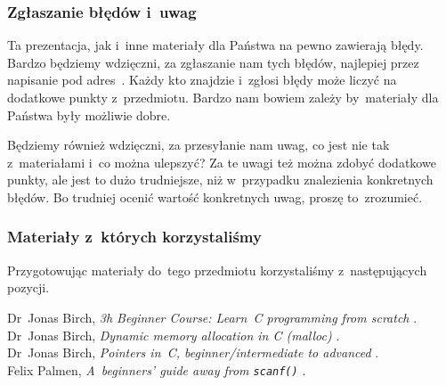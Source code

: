 \documentclass[10pt,t]{beamer}
\begin{document}
\begin{frame}
  \frametitle{Zgłaszanie błędów i~uwag}


  Ta prezentacja, jak i~inne materiały dla Państwa na pewno zawierają
  błędy. Bardzo będziemy wdzięczni, za zgłaszanie nam tych błędów,
  najlepiej przez napisanie pod adres~\email. Każdy kto znajdzie i~zgłosi
  błędy może liczyć na dodatkowe punkty z~przedmiotu. Bardzo nam bowiem
  zależy by~materiały dla Państwa były możliwie dobre.

  Będziemy również wdzięczni, za przesyłanie nam uwag, co jest nie tak
  z~materiałami i~co można ulepszyć? Za te uwagi też można zdobyć dodatkowe
  punkty, ale jest to dużo trudniejsze, niż w~przypadku znalezienia
  konkretnych błędów. Bo trudniej ocenić wartość konkretnych uwag, proszę
  to~zrozumieć.

\end{frame}










\appendix










\begin{frame}
  \frametitle{Materiały z~których korzystaliśmy}


  Przygotowując materiały do~tego przedmiotu korzystaliśmy z~następujących
  pozycji.

  Dr~Jonas Birch, \textit{3h Beginner Course: Learn~C programming from
    scratch}
  \parencite{Birch-3h-Beginner-Course-Learn-C-programming-ETC-Ver-2025}. \\
  Dr~Jonas Birch, \textit{Dynamic memory allocation in C (malloc)}
  \parencite{Birch-Dynamic-memory-allocation-in-C-malloc-Ver-2024}. \\
  Dr~Jonas Birch, \textit{Pointers in~C, beginner/intermediate to advanced}
  \parencite{Birch-Pointers-in-C-beginner-intermediate-ETC-Ver-2024}. \\
  Felix Palmen, \textit{A~beginners' guide \textit{away} from
    \texttt{scanf()}}
  \parencite{Palmen-A-beginners-guide-away-from-scanf-Ver-2017}.

\end{frame}











\printbibliography





\end{document}
